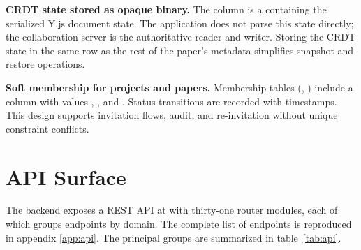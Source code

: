 \textbf{CRDT state stored as opaque binary.} The  column is a  containing the serialized Y.js document state. The application does not parse this state directly; the collaboration server is the authoritative reader and writer. Storing the CRDT state in the same row as the rest of the paper's metadata simplifies snapshot and restore operations.

\textbf{Soft membership for projects and papers.} Membership tables (, ) include a  column with values , , and . Status transitions are recorded with timestamps. This design supports invitation flows, audit, and re-invitation without unique constraint conflicts.

\section{API Surface}
\label{sec:arch-api}

The backend exposes a REST API at  with thirty-one router modules, each of which groups endpoints by domain. The complete list of endpoints is reproduced in appendix \ref{app:api}. The principal groups are summarized in table~\ref{tab:api}.

